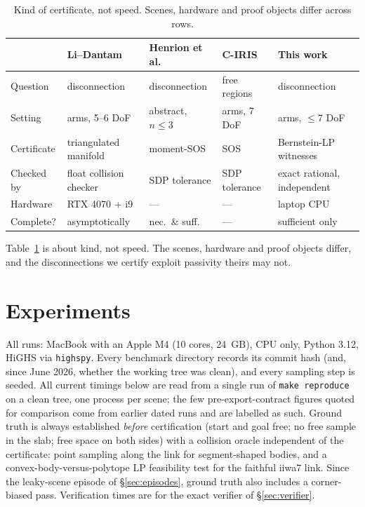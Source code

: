 \documentclass[10pt,twocolumn,letterpaper]{article}
\begin{document}
\begin{table}[t]
\centering\small
\caption{Kind of certificate, not speed. Scenes, hardware and proof objects differ across rows.}
\label{tab:nature}
\begin{tabular}{@{}lllll@{}}
\toprule
 & Li--Dantam~\cite{li2024gpu} & Henrion et al.~\cite{henrion2024} & C-IRIS~\cite{dai2024ciris} & This work \\
\midrule
Question & disconnection & disconnection & free regions & disconnection \\
Setting & arms, 5--6 DoF & abstract, $n\le3$ & arms, 7 DoF & arms, $\le7$ DoF \\
Certificate & triangulated manifold & moment-SOS & SOS & Bernstein-LP witnesses \\
Checked by & float collision checker & SDP tolerance & SDP tolerance & exact rational, independent \\
Hardware & RTX 4070 + i9 & --- & --- & laptop CPU \\
Complete? & asymptotically & nec.\ \& suff. & --- & sufficient only \\
\bottomrule
\end{tabular}
\end{table}

Table~\ref{tab:nature} is about kind, not speed. The scenes, hardware and proof objects differ, and the disconnections we certify exploit passivity theirs may not.

\section{Experiments}\label{sec:experiments}

All runs: MacBook with an Apple M4 (10 cores, 24~GB), CPU only, Python 3.12, HiGHS via \texttt{highspy}. Every benchmark directory records its commit hash (and, since June 2026, whether the working tree was clean), and every sampling step is seeded. All current timings below are read from a single run of \texttt{make reproduce} on a clean tree, one process per scene; the few pre-export-contract figures quoted for comparison come from earlier dated runs and are labelled as such. Ground truth is always established \emph{before} certification (start and goal free; no free sample in the slab; free space on both sides) with a collision oracle independent of the certificate: point sampling along the link for segment-shaped bodies, and a convex-body-versus-polytope LP feasibility test for the faithful iiwa7 link. Since the leaky-scene episode of \S\ref{sec:episodes}, ground truth also includes a corner-biased pass. Verification times are for the exact verifier of \S\ref{sec:verifier}.
\end{document}
